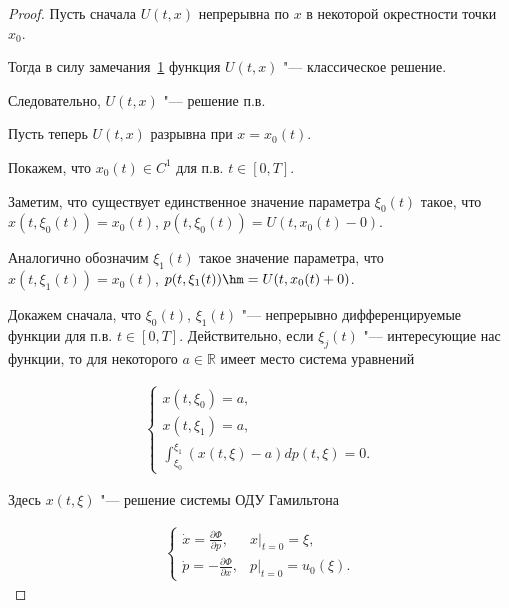 \begin{proof} Пусть сначала $U(t,x)$ непрерывна по $x$ в некоторой окрестности точки $x_0$. 

Тогда в силу замечания~\hyperlink{remark1}{1} функция $U(t,x)$ "--- классическое решение. 

Следовательно, $U(t,x)$ "--- решение п.в.





Пусть теперь $U(t,x)$ разрывна при $x=x_0(t)$. 

Покажем, что $x_0(t)\in C^1$ для п.в. $t\in[0,T]$. 

Заметим, что существует единственное значение параметра $\xi_0(t)$ такое, что $x(t,\xi_0(t))=x_0(t)$, $p(t,\xi_0(t))=U(t,x_0(t)-0)$. 

Аналогично обозначим $\xi_1(t)$ такое значение параметра, что $x(t,\xi_1(t))=x_0(t)$, $p(t,\xi_1(t))\hm =U(t,x_0(t)+0)$.



Докажем сначала, что $\xi_0(t)$, $\xi_1(t)$ "--- непрерывно дифференцируемые функции для п.в. $t\in[0,T]$. Действительно, если $\xi_j(t)$ "--- интересующие нас функции, то для некоторого $a\in\mathbb{R}$ имеет место система уравнений

\begin{gather}

\left\{\begin{array}{l} 

x(t,\xi_0)=a,\\

x(t,\xi_1)=a,\\[2mm]

\displaystyle \int _{\xi_0}^{\xi_1}(x(t,\xi)-a)dp(t,\xi)=0.

\end{array}\right.\label{eq-SupportiveForProof-E*St-is-D'-1}

\end{gather}

Здесь $x(t,\xi)$ "--- решение системы ОДУ Гамильтона

\begin{gather}

\left\{\begin{array}{ll}

\dot{x}=\frac{\partial\Phi}{\partial p},& x\bigr|_{t=0}=\xi,\\[2mm]

\dot{p}=-\frac{\partial\Phi}{\partial x}, &p\bigr|_{t=0}=u_0(\xi).


\end{array}
\end{gather}
\end{proof}
